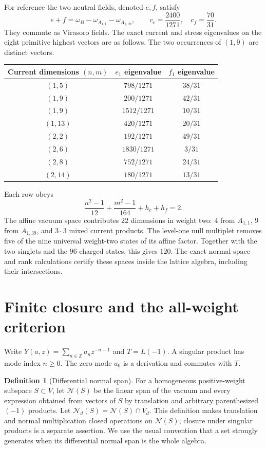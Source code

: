 \documentclass[11pt,a4paper]{article}
\theoremstyle{definition}
\newtheorem{definition}[theorem]{Definition}
\newcommand{\ZZ}{\mathbb Z}
\begin{document}
For reference the two neutral fields, denoted $e,f$, satisfy
\begin{equation}\label{eq:two-coset-stresses}
 e+f=\omega_B-\omega_{A_{1,1}}-\omega_{A_{1,39}},\qquad
 c_e=\frac{2400}{1271},\quad c_f=\frac{70}{31}.
\end{equation}
They commute as Virasoro fields. The exact current and stress
eigenvalues on the eight primitive highest vectors are as follows.
The two occurrences of $(1,9)$ are distinct vectors.
\begin{center}
\begin{tabular}{@{}ccc@{}}
\toprule
Current dimensions $(n,m)$ & $e_1$ eigenvalue & $f_1$ eigenvalue\\
\midrule
$(1,5)$ & $798/1271$ & $38/31$\\
$(1,9)$ & $200/1271$ & $42/31$\\
$(1,9)$ & $1512/1271$ & $10/31$\\
$(1,13)$ & $420/1271$ & $20/31$\\
$(2,2)$ & $192/1271$ & $49/31$\\
$(2,6)$ & $1830/1271$ & $3/31$\\
$(2,8)$ & $752/1271$ & $24/31$\\
$(2,14)$ & $180/1271$ & $13/31$\\
\bottomrule
\end{tabular}
\end{center}
Each row obeys
\[
 \frac{n^2-1}{12}+\frac{m^2-1}{164}+h_e+h_f=2.
\]
The affine vacuum space contributes $22$ dimensions in weight two:
$4$ from $A_{1,1}$, $9$ from $A_{1,39}$, and $3\cdot3$ mixed
current products. The level-one null multiplet removes five of the
nine universal weight-two states of its affine factor. Together with
the two singlets and the $96$ charged states, this gives $120$.
The exact normal-space and rank calculations certify these spaces
inside the lattice algebra, including their intersections.

\section{Finite closure and the all-weight criterion}\label{sec:finite}
Write \(Y(a,z)=\sum_{n\in\ZZ}a_nz^{-n-1}\) and \(T=L(-1)\).
A singular product has mode index \(n\geq0\). The zero mode \(a_0\)
is a derivation and commutes with \(T\).

\begin{definition}[Differential normal span]\label{def:normal-span}
For a homogeneous positive-weight subspace $S\subset V$, let
$\mathcal N(S)$ be the linear span of the vacuum and every expression
obtained from vectors of $S$ by translation and arbitrary parenthesized
$(-1)$ products. Let $\mathcal N_d(S)=\mathcal N(S)\cap V_d$.
This definition makes translation and normal multiplication closed
operations on $\mathcal N(S)$; closure under singular products is a
separate assertion. We use the usual convention that a set strongly
generates when its differential normal span is the whole algebra.
\end{definition}
\end{document}
